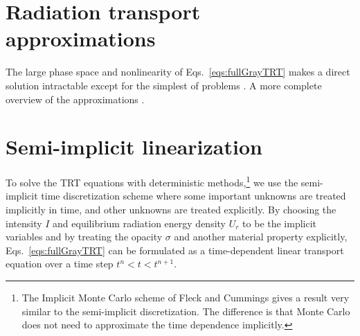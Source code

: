 \section{Radiation transport approximations}

The large phase space and nonlinearity of Eqs.~\eqref{eqs:fullGrayTRT} makes a
direct solution intractable except for the simplest of problems
\cite{Su1997,Mos2006}. A more complete overview of the
approximations \cite{Bru2002,Ols2000,Wol2008}.

\section{Semi-implicit linearization}

To solve the TRT equations with deterministic methods,\footnote{The Implicit
Monte Carlo scheme of Fleck and Cummings \cite{Fle1971} gives a result very
similar to the semi-implicit discretization. The difference is that Monte
Carlo does not need to approximate the time dependence implicitly.} we use the
semi-implicit time
discretization scheme \cite{Kno1999a,Kno2001,Low2004} where some important
unknowns are treated implicitly in
time, and other unknowns are treated explicitly. By choosing the intensity $I$
and equilibrium radiation energy density $U_r$ to be the implicit variables and 
by treating the opacity $\sigma$ and another material property explicitly,
Eqs.~\eqref{eqs:fullGrayTRT} can be formulated as a time-dependent linear
transport equation over a time step $t^n < t < t^{n+1}$.

